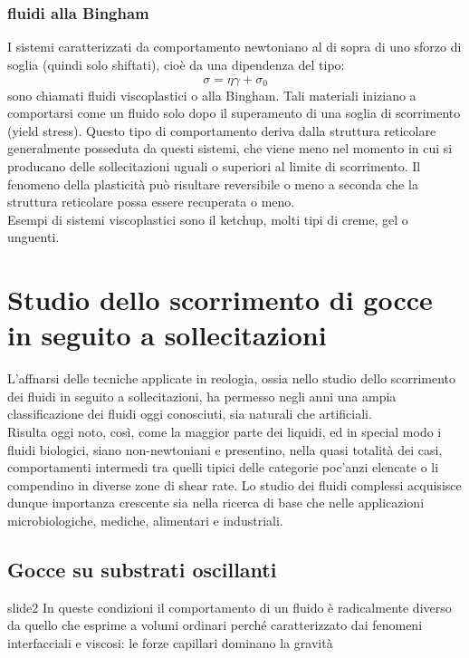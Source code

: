 \documentclass[letterpaper,12pt]{article}
\begin{document}
\subsubsection{fluidi alla Bingham}
I sistemi caratterizzati da comportamento newtoniano al di sopra di uno
sforzo di soglia (quindi solo shiftati), cioè da una dipendenza del tipo:
\begin{equation}
\sigma=\eta\dot{\gamma}	+ \sigma_0
\end{equation}
sono chiamati fluidi viscoplastici o alla Bingham. Tali materiali iniziano a
comportarsi come un fluido solo dopo il superamento di una soglia di scorrimento (yield stress). Questo tipo di comportamento deriva dalla struttura reticolare generalmente posseduta da questi sistemi, che viene meno nel momento in cui si producano delle sollecitazioni uguali o superiori al limite di scorrimento. Il fenomeno della plasticità può risultare reversibile o meno a seconda che la struttura reticolare possa essere recuperata o meno.\\
Esempi di sistemi viscoplastici sono il ketchup, molti tipi di creme, gel o
unguenti.

\section{Studio dello scorrimento di gocce in seguito a sollecitazioni}
L'affnarsi delle tecniche applicate in reologia, ossia nello studio dello
scorrimento dei fluidi in seguito a sollecitazioni, ha permesso negli anni una ampia classificazione dei fluidi oggi conosciuti, sia naturali che artificiali.\\
Risulta oggi noto, così, come la maggior parte dei liquidi, ed in special modo i fluidi biologici, siano non-newtoniani e presentino, nella quasi totalità dei casi, comportamenti intermedi tra quelli tipici delle categorie poc'anzi elencate o li compendino in diverse zone di shear rate. Lo studio dei fluidi complessi acquisisce dunque importanza crescente sia nella ricerca di base che nelle applicazioni microbiologiche, mediche, alimentari e
industriali.
\subsection{Gocce su substrati oscillanti}

slide2
In queste condizioni il comportamento di un fluido è radicalmente diverso da quello che esprime a volumi ordinari perché caratterizzato dai fenomeni interfacciali e viscosi: le forze capillari dominano la gravità
\end{document}
